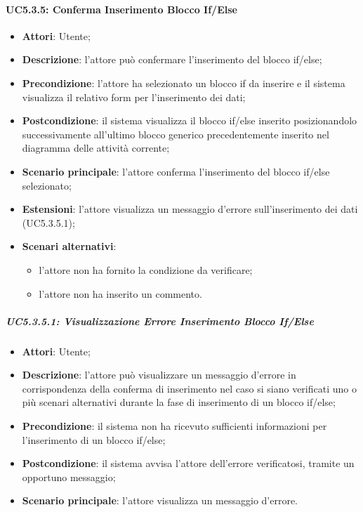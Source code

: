 \paragraph{UC5.3.5: Conferma Inserimento Blocco If/Else}
\label{UC5.3.5}
\begin{itemize}
	\item \textbf{Attori}: Utente;
	\item \textbf{Descrizione}: l'attore può confermare l'inserimento del blocco if/else;
	\item \textbf{Precondizione}: l'attore ha selezionato un blocco if da inserire e il sistema visualizza il relativo form per l'inserimento dei dati;
	\item \textbf{Postcondizione}: il sistema visualizza il blocco if/else inserito posizionandolo successivamente all'ultimo blocco generico precedentemente inserito nel diagramma delle attività corrente;
	\item \textbf{Scenario principale}: l'attore conferma l'inserimento del blocco if/else selezionato;
	\item \textbf{Estensioni}: l'attore visualizza un messaggio d'errore sull'inserimento dei dati (UC5.3.5.1);
	\item \textbf{Scenari alternativi}:
	\begin{itemize}
		\item l'attore non ha fornito la condizione da verificare;
		\item l'attore non ha inserito un commento.
	\end{itemize}
\end{itemize}

\subparagraph{UC5.3.5.1: Visualizzazione Errore Inserimento Blocco If/Else}
\label{UC5.3.5.1}
\begin{itemize}
	\item \textbf{Attori}: Utente;
	\item \textbf{Descrizione}: l'attore può visualizzare un messaggio d'errore in corrispondenza della conferma di inserimento nel caso si siano verificati uno o più scenari alternativi durante la fase di inserimento di un blocco if/else;
	\item \textbf{Precondizione}: il sistema non ha ricevuto sufficienti informazioni per l'inserimento di un blocco if/else;
	\item \textbf{Postcondizione}: il sistema avvisa l'attore dell'errore verificatosi, tramite un opportuno messaggio;
	\item \textbf{Scenario principale}: l'attore visualizza un messaggio d'errore.
\end{itemize}


